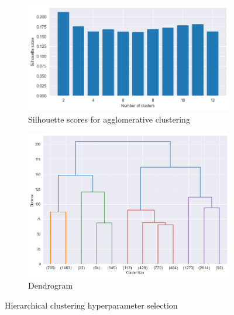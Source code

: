\begin{figure}[H]
    \hspace*{\fill}
    \centering
    \begin{subfigure}[b]{0.45\textwidth}
        \centering
        \includegraphics[width=1.0\textwidth]{src/figs/silhouette_agglomerative.png} 
        \caption{Silhouette scores for agglomerative clustering}\label{fig:silhouette_agglomerative}
    \end{subfigure}
    \hfill
    \begin{subfigure}[b]{0.45\textwidth}
        \centering
        \includegraphics[width=1.0\textwidth]{src/figs/dendrogram.png} 
        \caption{Dendrogram}\label{fig:dendrogram}
    \end{subfigure}\label{fig:silhouette_dendrogram}
    \caption{Hierarchical clustering hyperparameter selection}\label{fig:hyperparameters_hierarchical}
    \hspace*{\fill}
\end{figure}



